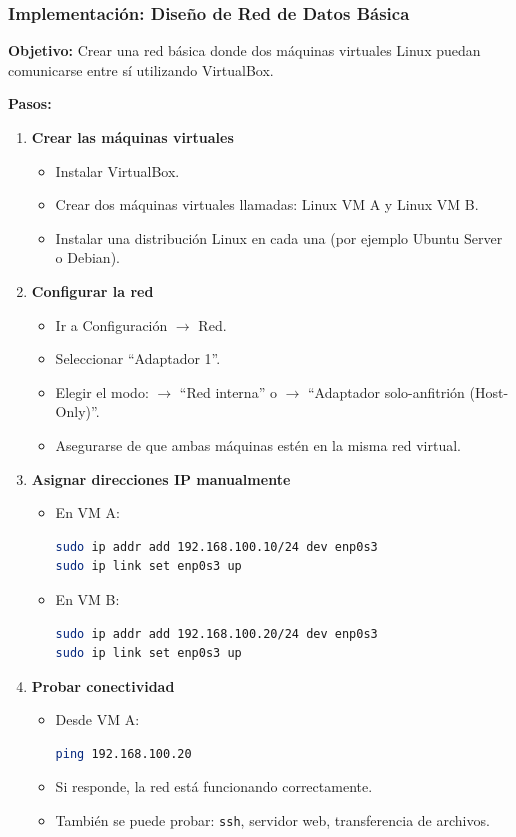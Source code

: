 \documentclass[stu, 12pt, letterpaper, donotrepeattitle, floatsintext, noapacite]{apa7}
\begin{document}
\subsubsection{Implementación: Diseño de Red de Datos Básica}
\textbf{Objetivo:} Crear una red básica donde dos máquinas virtuales Linux puedan comunicarse entre sí utilizando VirtualBox.

\textbf{Pasos:}
\begin{enumerate}
    \item \textbf{Crear las máquinas virtuales}
    \begin{itemize}
        \item Instalar VirtualBox.
        \item Crear dos máquinas virtuales llamadas: Linux VM A y Linux VM B.
        \item Instalar una distribución Linux en cada una (por ejemplo Ubuntu Server o Debian).
    \end{itemize}
    \item \textbf{Configurar la red}
    \begin{itemize}
        \item Ir a Configuración $\rightarrow$ Red.
        \item Seleccionar ``Adaptador 1''.
        \item Elegir el modo: $\rightarrow$ ``Red interna'' o $\rightarrow$ ``Adaptador solo-anfitrión (Host-Only)''.
        \item Asegurarse de que ambas máquinas estén en la misma red virtual.
    \end{itemize}
    \item \textbf{Asignar direcciones IP manualmente}
    \begin{itemize}
        \item En VM A: 
        \begin{lstlisting}[language=bash]
sudo ip addr add 192.168.100.10/24 dev enp0s3
sudo ip link set enp0s3 up
        \end{lstlisting}
        \item En VM B: 
        \begin{lstlisting}[language=bash]
sudo ip addr add 192.168.100.20/24 dev enp0s3
sudo ip link set enp0s3 up
        \end{lstlisting}
    \end{itemize}
    \item \textbf{Probar conectividad}
    \begin{itemize}
        \item Desde VM A: 
        \begin{lstlisting}[language=bash]
ping 192.168.100.20
        \end{lstlisting}
        \item Si responde, la red está funcionando correctamente.
        \item También se puede probar: \texttt{ssh}, servidor web, transferencia de archivos.
    \end{itemize}
\end{enumerate}
\end{document}
